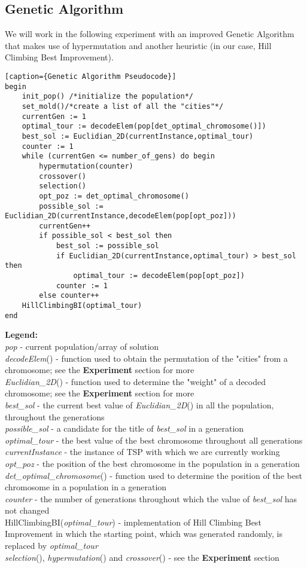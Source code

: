 \documentclass[a4paper]{article}
\begin{document}
\subsection{Genetic Algorithm}

We will work in the following experiment with an improved Genetic Algorithm that makes use of hypermutation and another heuristic (in our case, Hill Climbing Best Improvement).

\begin{lstlisting}[frame=single][caption={Genetic Algorithm Pseudocode}]
begin
	init_pop() /*initialize the population*/
	set_mold()/*create a list of all the "cities"*/ 
	currentGen := 1
	optimal_tour := decodeElem(pop[det_optimal_chromosome()])
	best_sol := Euclidian_2D(currentInstance,optimal_tour)
	counter := 1
	while (currentGen <= number_of_gens) do begin
		hypermutation(counter)
		crossover()
		selection()
		opt_poz := det_optimal_chromosome()
		possible_sol := Euclidian_2D(currentInstance,decodeElem(pop[opt_poz]))
		currentGen++
		if possible_sol < best_sol then
			best_sol := possible_sol
			if Euclidian_2D(currentInstance,optimal_tour) > best_sol then
				optimal_tour := decodeElem(pop[opt_poz])
			counter := 1
		else counter++
	HillClimbingBI(optimal_tour)
end
\end{lstlisting}
\justify
\textbf{Legend:}\\
{\itshape pop} - current population/array of solution\\
{\itshape decodeElem}() - function used to obtain the permutation of the "cities" from a chromosome; see the \textbf{Experiment} section for more\\
{\itshape Euclidian\_2D}() - function used to determine the "weight" of a decoded chromosome; see the \textbf{Experiment} section for more\\
{\itshape best\_sol} - the current best value of \emph{Euclidian\_2D}() in all the population, throughout the generations\\
{\itshape possible\_sol} - a candidate for the title of {\itshape best\_sol} in a generation\\
{\itshape optimal\_tour} - the best value of the best chromosome throughout all generations\\
{\itshape currentInstance} - the instance of TSP with which we are currently working\\
{\itshape opt\_poz} - the position of the best chromosome in the population in a generation\\
{\itshape det\_optimal\_chromosome}() - function used to determine the position of the best chromosome in a population in a generation\\
{\itshape counter} - the number of generations throughout which the value of {\itshape best\_sol} has not changed\\
{\sffamily HillClimbingBI}({\itshape optimal\_tour}) - implementation of Hill Climbing Best Improvement\cite{heuristic} in which the starting point, which was generated randomly, is replaced by {\itshape optimal\_tour}\\
{\itshape selection}(), {\itshape hypermutation}()\cite{mutation} and {\itshape crossover}() - see the \textbf{Experiment} section
\end{document}
